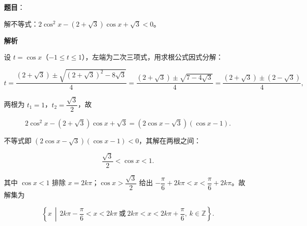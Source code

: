 \begin{answer}

\textbf{题目}：

解不等式：$2\cos^{2}x-(2+\sqrt3)\cos x+\sqrt3<0$。

\textbf{解析}

设 $t=\cos x$（$-1\le t\le1$），左端为二次三项式，用求根公式因式分解：

\nopagebreak[4]
\[
t=\frac{(2+\sqrt3)\pm\sqrt{(2+\sqrt3)^{2}-8\sqrt3}}{4}
=\frac{(2+\sqrt3)\pm\sqrt{7-4\sqrt3}}{4}
=\frac{(2+\sqrt3)\pm(2-\sqrt3)}{4},
\]

两根为 $t_{1}=1$，$t_{2}=\dfrac{\sqrt3}{2}$，故

\nopagebreak[4]
\[
2\cos^{2}x-(2+\sqrt3)\cos x+\sqrt3
=(2\cos x-\sqrt3)(\cos x-1).
\]

不等式即 $(2\cos x-\sqrt3)(\cos x-1)<0$，其解在两根之间：

\nopagebreak[4]
\[
\frac{\sqrt3}{2}<\cos x<1.
\]

其中 $\cos x<1$ 排除 $x=2k\pi$；$\cos x>\dfrac{\sqrt3}{2}$ 给出 $-\dfrac{\pi}{6}+2k\pi<x<\dfrac{\pi}{6}+2k\pi$。故解集为

\nopagebreak[4]
\[
\left\{x\,\middle|\,2k\pi-\frac{\pi}{6}<x<2k\pi\ \text{或}\ 2k\pi<x<2k\pi+\frac{\pi}{6},\ k\in\mathbb{Z}\right\}.
\]


\end{answer}